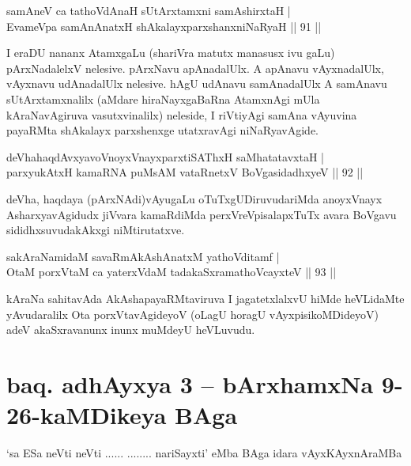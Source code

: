 \begin{shl}
samAneV ca tathoVdAnaH sUtArxtamxni samAshirxtaH |\\
EvameVpa samAnAnatxH shAkalayxparxshanxniNaRyaH \hfill || 91 ||
\end{shl}

\begin{artha}
I eraDU nananx AtamxgaLu (shariVra matutx manasusx ivu gaLu) pArxNadalelxV nelesive. pArxNavu apAnadalUlx. A apAnavu vAyxnadalUlx, vAyxnavu udAnadalUlx nelesive. hAgU udAnavu samAnadalUlx A samAnavu sUtArxtamxnalilx (aMdare hiraNayxgaBaRna AtamxnAgi mUla kAraNavAgiruva vasutxvinalilx) neleside, I riVtiyAgi samAna vAyuvina payaRMta shAkalayx parxshenxge utatxravAgi niNaRyavAgide.
\end{artha}


\begin{shl}
deVhahaqdAvxyavoV\s noyxVnayxparxtiSAThxH saMhatatavxtaH |\\
parxyukAtxH kamaRNA puMsAM vataRnetxV BoVgasidadhxyeV \hfill || 92 ||
\end{shl}

\begin{artha}%
deVha, haqdaya (pArxNAdi)vAyugaLu oTuTxgUDiruvudariMda anoyxVnayx AsharxyavAgidudx jiVvara kamaRdiMda perxVreVpisalapxTuTx avara BoVgavu sididhxsuvudakAkxgi niMtirutatxve.
\end{artha}

\begin{shl}
sakAraNamidaM savaRmAkAshAnatxM yathoVditamf |\\
OtaM porxVtaM ca yaterxVdaM tadakaSxramathoVcayxteV \hfill || 93 ||
\end{shl}

\begin{artha}
kAraNa sahitavAda AkAshapayaRMtaviruva I jagatetxlalxvU hiMde heVLidaMte yAvudaralilx Ota porxVtavAgideyoV (oLagU horagU vAyxpisikoMDideyoV) adeV akaSxravanunx inunx muMdeyU heVLuvudu.
\end{artha}

\section*{baq. adhAyxya 3 -- bArxhamxNa 9-26-kaMDikeya BAga}

\begin{shl}
`sa ESa neVti neVti ...... ........ nariSayxti' eMba BAga idara vAyxKAyxnAraMBa
\end{shl}

